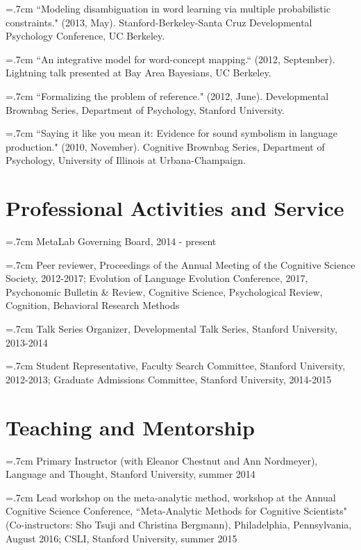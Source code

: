 \documentclass[letterpaper]{article}
\renewenvironment{itemize}{
  \begin{list}{}{
    \setlength{\leftmargin}{1.5em}
  }
}{
  \end{list}
}
\begin{document}
\hangindent=.7cm ``Modeling disambiguation in word learning via multiple probabilistic constraints." (2013, May). Stanford-Berkeley-Santa Cruz Developmental Psychology Conference, UC Berkeley.

 \hangindent=.7cm ``An integrative model for word-concept mapping.`` (2012, September). Lightning talk presented at Bay Area Bayesians, UC Berkeley.

\hangindent=.7cm ``Formalizing the problem of reference."  (2012, June). Developmental Brownbag Series, Department of Psychology, Stanford University.

\hangindent=.7cm ``Saying it like you mean it: Evidence for sound symbolism in language production." (2010, November). Cognitive Brownbag Series, Department of Psychology, University of Illinois at Urbana-Champaign.

 
 \singlespacing


\section*{Professional Activities and Service}
\hangindent=.7cm MetaLab Governing Board, 2014 - present

\hangindent=.7cm  Peer reviewer, Proceedings of the Annual Meeting of the Cognitive Science Society, 2012-2017; Evolution of Language Evolution Conference, 2017,  Psychonomic Bulletin \& Review, Cognitive Science, Psychological Review, Cognition, Behavioral Research Methods

\hangindent=.7cm Talk Series Organizer, Developmental Talk Series, Stanford University, 2013-2014

\hangindent=.7cm Student Representative, Faculty Search Committee, Stanford University, 2012-2013; Graduate Admissions Committee, Stanford University, 2014-2015


\section*{Teaching and Mentorship}
\hangindent=.7cm Primary Instructor (with Eleanor Chestnut and Ann Nordmeyer), Language and Thought, Stanford University, summer 2014

\hangindent=.7cm Lead workshop on the meta-analytic method, workshop at the Annual Cognitive Science Conference, ``Meta-Analytic Methods for Cognitive Scientists" (Co-instructors: Sho Tsuji and Christina Bergmann), Philadelphia, Pennsylvania, August 2016; CSLI, Stanford University, summer 2015
\end{document}
